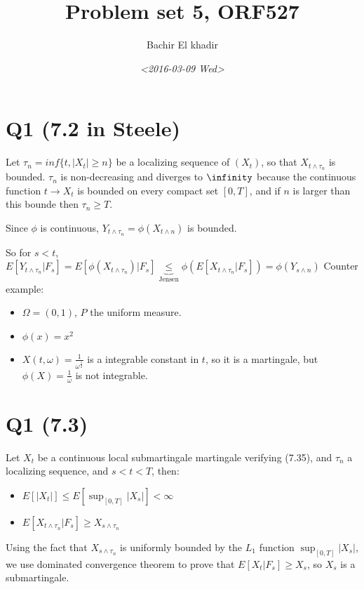 \documentclass[11pt]{article}
\author{Bachir El khadir}
\date{\textit{<2016-03-09 Wed>}}
\title{Problem set 5, ORF527}
\begin{document}
\maketitle

\section{Q1 (7.2 in Steele)}
\label{sec:orgheadline1}

Let \(\tau_n = inf\{t, |X_t| \ge n\}\) be a localizing sequence of \((X_t)\), so that \(X_{t \wedge \tau_n}\) is bounded. \(\tau_n\) is non-decreasing and diverges to \(\infinity\) because the continuous function \(t \rightarrow X_t\) is bounded on every compact set \([0, T]\), and if \(n\) is larger than this bounde then \(\tau_n \ge T\).

Since \(\phi\) is continuous, \(Y_{t \wedge \tau_n} = \phi(X_{t \wedge n})\) is bounded.


So for \(s < t\), \(E[Y_{t \wedge \tau_n} | F_s] = E[\phi(X_{t \wedge \tau_n}) | F_s] \underbrace{\le}_{\text{Jensen}} \phi(E[X_{t \wedge \tau_n} | F_s]) = \phi(Y_{s \wedge n})\)
Counter example:
\begin{itemize}
\item \(\Omega = (0, 1)\), \(P\) the uniform measure.
\item \(\phi(x) = x^2\)
\item \(X(t, \omega) = \frac{1}{\omega^{\frac 12}}\) is a integrable constant in \(t\), so it is a martingale, but \(\phi(X) = \frac{1}{\omega}\) is not integrable.
\end{itemize}


\section{Q1 (7.3)}
\label{sec:orgheadline2}
Let \(X_t\) be a continuous local submartingale martingale verifying (7.35), and \(\tau_n\) a localizing sequence, and \(s < t < T\), then:

\begin{itemize}
\item \(E[|X_t|] \le E[\sup_{[0, T]} |X_s|] < \infty\)
\item \(E[X_{t \wedge \tau_n} | F_s] \ge X_{s \wedge \tau_n}\)
\end{itemize}

Using the fact that \(X_{s \wedge \tau_n}\) is uniformly bounded by the \(L_1\) function \(\sup_{[0, T]} |X_s|\), we use dominated convergence theorem to prove that
\(E[X_t | F_s] \ge X_s\), so \(X_s\) is a submartingale.
\end{document}
